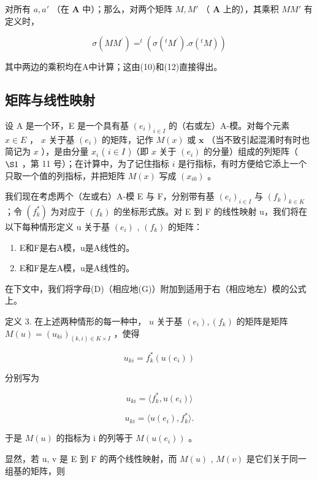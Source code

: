 对所有 \(a, a'\) （在 \(\mathbf{A}\) 中）；那么，对两个矩阵 \(M, M'\) （ \(\mathbf{A}\) 上的），其乘积 \(MM'\) 有定义时，

\[
\sigma (M M ^ {\prime}) = ^ {t} (\sigma (^ {t} M ^ {\prime}). \sigma (^ {t} M))\tag{13}
\]

其中两边的乘积均在A中计算；这由(10)和(12)直接得出。

\subsection{矩阵与线性映射}

设 A 是一个环，E 是一个具有基 \((e_i)_{i\in I}\) 的（右或左）A-模。对每个元素 \(x\in E\) ， \(x\) 关于基 \((e_i)\) 的矩阵，记作 \(M(x)\) 或 \(\mathbf{x}\) （当不致引起混淆时有时也简记为 \(x\) ），是由分量 \(x_i\) ( \(i\in I\) )（即 \(x\) 关于 \((e_i)\) 的分量）组成的列矩阵（ \(\S 1\) ，第 11 号）；在计算中，为了记住指标 \(i\) 是行指标，有时方便给它添上一个只取一个值的列指标，并把矩阵 \(M(x)\) 写成 \((x_{i0})\) 。

我们现在考虑两个（左或右）A-模 E 与 F，分别带有基 \((e_{i})_{i\in I}\) 与 \((f_{k})_{k\in K}\) ；令 \((f_{k}^{*})\) 为对应于 \((f_{k})\) 的坐标形式族。对 E 到 F 的线性映射 u，我们将在以下每种情形定义 u 关于基 \((e_{i})\) , \((f_{k})\) 的矩阵：

\begin{enumerate}
\def\labelenumi{(\Alph{enumi})}
\setcounter{enumi}{3}
\item
  E和F是右A模，u是A线性的。
\item
  E和F是左A模，u是A线性的。
\end{enumerate}

在下文中，我们将字母(D)（相应地(G)）附加到适用于右（相应地左）模的公式上。

定义 3. 在上述两种情形的每一种中， \(u\) 关于基 \((e_i), (f_k)\) 的矩阵是矩阵 \(M(u) = (u_{ki})_{(k,i) \in K \times I}\) ，使得

\[
u _ {k i} = f _ {k} ^ {*} (u (e _ {i}))\tag{14}
\]

分别写为

\[
u _ {k i} = \langle f _ {k} ^ {*}, u (e _ {i}) \rangle\tag{14 D}
\]

\[
u _ {k i} = \langle u (e _ {i}), f _ {k} ^ {*} \rangle .\tag{14 G}
\]

于是 \(M(u)\) 的指标为 i 的列等于 \(M(u(e_{i}))\) 。

显然，若 u, v 是 E 到 F 的两个线性映射，而 \(M(u)\) , \(M(v)\) 是它们关于同一组基的矩阵，则

